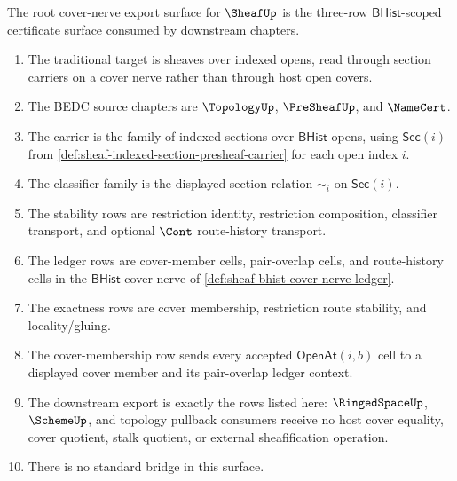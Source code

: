 \begin{definition}
\label{def:sheaf-root-cover-nerve-export-surface}
The root cover-nerve export surface for $\SheafUp$ is the three-row $\mathsf{BHist}$-scoped certificate surface consumed by downstream chapters.
\begin{enumerate}
\item The traditional target is sheaves over indexed opens, read through section carriers on a cover nerve rather than through host open covers.
\item The BEDC source chapters are $\TopologyUp$, $\PreSheafUp$, and $\NameCert$.
\item The carrier is the family of indexed sections over $\mathsf{BHist}$ opens, using $\mathsf{Sec}(i)$ from \autoref{def:sheaf-indexed-section-presheaf-carrier} for each open index $i$.
\item The classifier family is the displayed section relation $\sim_i$ on $\mathsf{Sec}(i)$.
\item The stability rows are restriction identity, restriction composition, classifier transport, and optional $\Cont$ route-history transport.
\item The ledger rows are cover-member cells, pair-overlap cells, and route-history cells in the $\mathsf{BHist}$ cover nerve of \autoref{def:sheaf-bhist-cover-nerve-ledger}.
\item The exactness rows are cover membership, restriction route stability, and locality/gluing.
\item The cover-membership row sends every accepted $\mathsf{OpenAt}(i,b)$ cell to a displayed cover member and its pair-overlap ledger context.
\item The downstream export is exactly the rows listed here: $\RingedSpaceUp$, $\SchemeUp$, and topology pullback consumers receive no host cover equality, cover quotient, stalk quotient, or external sheafification operation.
\item There is no standard bridge in this surface.
\end{enumerate}
\end{definition}

